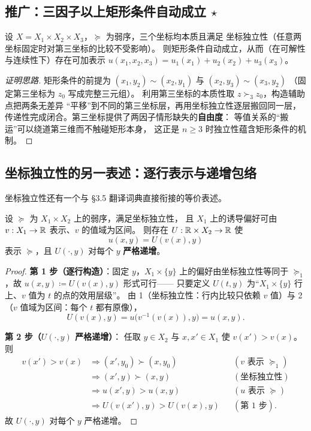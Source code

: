 \subsection{推广：三因子以上矩形条件自动成立 \texorpdfstring{$\star$}{*}}

\begin{proposition}\label{prop:3factor}
设 $X=X_1\times X_2\times X_3$，$\succeq$ 为弱序，三个坐标均本质且满足
坐标独立性（任意两坐标固定时对第三坐标的比较不受影响）。
则矩形条件自动成立，从而（在可解性与连续性下）存在可加表示
$u(x_1,x_2,x_3)=u_1(x_1)+u_2(x_2)+u_3(x_3)$。
\end{proposition}

\begin{proof}[证明思路]
矩形条件的前提为 $(x_1,y_2)\sim(x_2,y_1)$ 与 $(x_2,y_3)\sim(x_3,y_2)$
（固定第三坐标为 $z_0$ 写成完整三元组）。
利用第三坐标的本质性取 $z\succ_3 z_0$，构造辅助点把两条无差异
“平移”到不同的第三坐标层，再用坐标独立性逐层搬回同一层，
传递性完成闭合。第三坐标提供了两因子情形缺失的\textbf{自由度}：
等值关系的“搬运”可以绕道第三维而不触碰矩形本身，
这正是 $n\ge3$ 时独立性蕴含矩形条件的机制。
\end{proof}

\subsection{坐标独立性的另一表述：逐行表示与递增包络}

坐标独立性还有一个与 §3.5 翻译词典直接衔接的等价表述。

\begin{proposition}[逐行表示定理]\label{prop:rowwise}
设 $\succeq$ 为 $X_1\times X_2$ 上的弱序，满足坐标独立性，
且 $X_1$ 上的诱导偏好可由 $v:X_1\to\mathbb{R}$ 表示、$v$ 的值域为区间。
则存在 $U:\mathbb{R}\times X_2\to\mathbb{R}$ 使
\[
u(x,y)=U(v(x),y)
\]
表示 $\succeq$，且 $U(\cdot,y)$ 对每个 $y$ \textbf{严格递增}。
\end{proposition}

\begin{proof}
\textbf{第 1 步（逐行构造）}：固定 $y$，$X_1\times\{y\}$ 上的偏好由坐标独立性等同于
$\succeq_1$，故 $u(x,y)\coloneqq U(v(x),y)$ 形式可行——
只要定义 $U(t,y)$ 为“$X_1\times\{y\}$ 行上、$v$ 值为 $t$ 的点的效用层级”。
由 1（坐标独立性：行内比较只依赖 $v$ 值）与 2（$v$ 值域为区间：每个 $t$ 都有原像），
\[
U(v(x),y)=u\bigl(v^{-1}(v(x)),y\bigr)=u(x,y).
\]

\textbf{第 2 步（$U(\cdot,y)$ 严格递增）}：
任取 $y\in X_2$ 与 $x,x'\in X_1$ 使 $v(x')>v(x)$。则
\[
\begin{aligned}
v(x')>v(x)
&\Longrightarrow (x',y_0)\succ(x,y_0) && (\text{$v$ 表示 }\succeq_1)\\
&\Longrightarrow (x',y)\succ(x,y) && (\text{坐标独立性})\\
&\Longrightarrow u(x',y)>u(x,y) && (\text{$u$ 表示 }\succeq)\\
&\Longrightarrow U(v(x'),y)>U(v(x),y) && (\text{第 1 步}).
\end{aligned}
\]
故 $U(\cdot,y)$ 对每个 $y$ 严格递增。
\end{proof}

